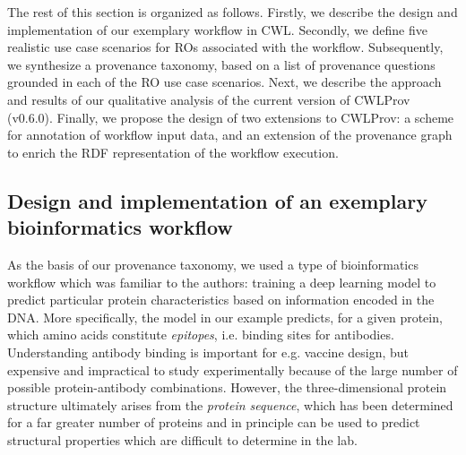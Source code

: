 The rest of this section is organized as follows. Firstly, we describe the design and implementation of our exemplary workflow in CWL. Secondly, we define five realistic use case scenarios for ROs associated with the workflow. Subsequently, we synthesize a provenance taxonomy, based on a list of provenance questions grounded in each of the RO use case scenarios. Next, we describe the approach and results of our qualitative analysis of the current version of CWLProv (v0.6.0). Finally, we propose the design of two extensions to CWLProv: a scheme for annotation of workflow input data, and an extension of the provenance graph to enrich the RDF representation of the workflow execution. 

\subsection{Design and implementation of an exemplary bioinformatics workflow}
\label{sec:renske:workflow}



As the basis of our provenance taxonomy, we used a type of bioinformatics workflow which was familiar to the authors: training a deep learning model to predict particular protein characteristics based on information encoded in the DNA. %
More specifically, the model in our example predicts, for a given protein, which amino acids constitute \emph{epitopes}, i.e. binding sites for antibodies. Understanding antibody binding is important for e.g. vaccine design, but expensive and impractical to study experimentally because of the large number of possible protein-antibody combinations. However, the three-dimensional protein structure ultimately arises from the \emph{protein sequence}, which has been determined for a far greater number of proteins and in principle can be used to predict structural properties which are difficult to determine in the lab.

